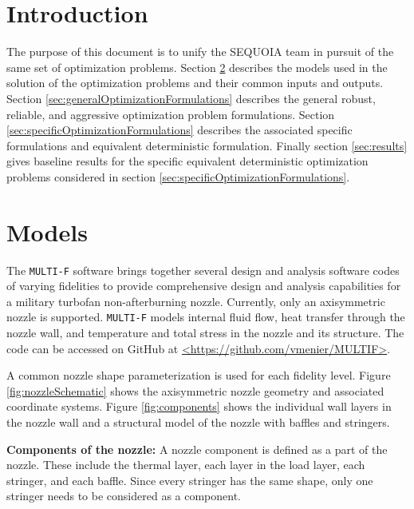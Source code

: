 \documentclass{article}
\begin{document}
\section{Introduction}

The purpose of this document is to unify the SEQUOIA team in pursuit of the same set of optimization problems. Section \ref{sec:models} describes the models used in the solution of the optimization problems and their common inputs and outputs. Section \ref{sec:generalOptimizationFormulations} describes the general robust, reliable, and aggressive optimization problem formulations.  Section \ref{sec:specificOptimizationFormulations} describes the associated specific formulations and equivalent deterministic formulation. Finally section \ref{sec:results} gives baseline results for the specific equivalent deterministic optimization problems considered in section \ref{sec:specificOptimizationFormulations}.

\section{Models} \label{sec:models}

The \texttt{MULTI-F} software brings together several design and analysis software codes of varying fidelities to provide comprehensive design and analysis capabilities for a military turbofan non-afterburning nozzle. Currently, only an axisymmetric nozzle is supported. \texttt{MULTI-F} models internal fluid flow, heat transfer through the nozzle wall, and temperature and total stress in the nozzle and its structure. The code can be accessed on GitHub at \url{<https://github.com/vmenier/MULTIF>}.

A common nozzle shape parameterization is used for each fidelity level. Figure \ref{fig:nozzleSchematic} shows the axisymmetric nozzle geometry and associated coordinate systems. Figure \ref{fig:components} shows the individual wall layers in the nozzle wall and a structural model of the nozzle with baffles and stringers.

\begin{mdframed}
\textbf{Components of the nozzle:} A nozzle component is defined as a part of the nozzle. These include the thermal layer, each layer in the load layer, each stringer, and each baffle. Since every stringer has the same shape, only one stringer needs to be considered as a component.
\end{mdframed}
\end{document}
